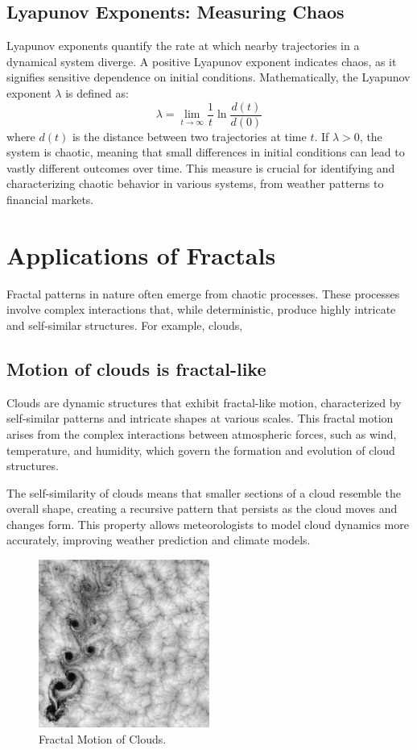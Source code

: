 \documentclass[12pt]{article}
\begin{document}
\subsection{Lyapunov Exponents: Measuring Chaos}
Lyapunov exponents quantify the rate at which nearby trajectories in a dynamical system diverge. A positive Lyapunov exponent indicates chaos, as it signifies sensitive dependence on initial conditions. Mathematically, the Lyapunov exponent \( \lambda \) is defined as:
\[
\lambda = \lim_{t \to \infty} \frac{1}{t} \ln \frac{d(t)}{d(0)}
\]
where \( d(t) \) is the distance between two trajectories at time \( t \). If \( \lambda > 0 \), the system is chaotic, meaning that small differences in initial conditions can lead to vastly different outcomes over time. This measure is crucial for identifying and characterizing chaotic behavior in various systems, from weather patterns to financial markets.

\section{Applications of Fractals}
Fractal patterns in nature often emerge from chaotic processes. These processes involve complex interactions that, while deterministic, produce highly intricate and self-similar structures. For example, clouds, 

\subsection{Motion of clouds is fractal-like}
Clouds are dynamic structures that exhibit fractal-like motion, characterized by self-similar patterns and intricate shapes at various scales. This fractal motion arises from the complex interactions between atmospheric forces, such as wind, temperature, and humidity, which govern the formation and evolution of cloud structures.

The self-similarity of clouds means that smaller sections of a cloud resemble the overall shape, creating a recursive pattern that persists as the cloud moves and changes form. This property allows meteorologists to model cloud dynamics more accurately, improving weather prediction and climate models.

\begin{figure}[H]
\centering
\includegraphics[width=0.5\textwidth]{assets/fractal-clouds.jpg}
\caption{Fractal Motion of Clouds.}
\label{fig:fractal-clouds}
\end{figure}
\end{document}
